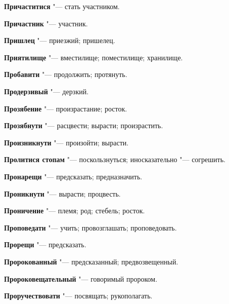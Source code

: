 \begin{mymulticols}{2}
\noindent\textbf{Причаститися} "--- стать участником. 




\noindent\textbf{Причастник} "--- участник. 




\noindent\textbf{Пришлец} "--- приезжий; пришелец. 




\noindent\textbf{Приятилище} "--- вместилище; поместилище; хранилище. 




\noindent\textbf{Пробавити} "--- продолжить; протянуть. 




\noindent\textbf{Продерзивый} "--- дерзкий. 




\noindent\textbf{Прозябение} "--- произрастание; росток. 




\noindent\textbf{Прозябнути} "--- расцвести; вырасти; произрастить. 




\noindent\textbf{Произникнути} "--- произойти; вырасти. 




\noindent\textbf{Пролитися стопам} "--- поскользнуться; иносказательно "--- согрешить. 




\noindent\textbf{Пронарещи} "--- предсказать; предназначить. 




\noindent\textbf{Проникнути} "--- вырасти; процвесть. 




\noindent\textbf{Проничение} "--- племя; род; стебель; росток. 




\noindent\textbf{Проповедати} "--- учить; провозглашать; проповедовать. 




\noindent\textbf{Прорещи} "--- предсказать. 




\noindent\textbf{Пророкованный} "--- предсказанный; предвозвещенный. 




\noindent\textbf{Пророковещательный} "--- говоримый пророком. 




\noindent\textbf{Проручествовати} "--- посвящать; рукополагать. 





\end{mymulticols}
